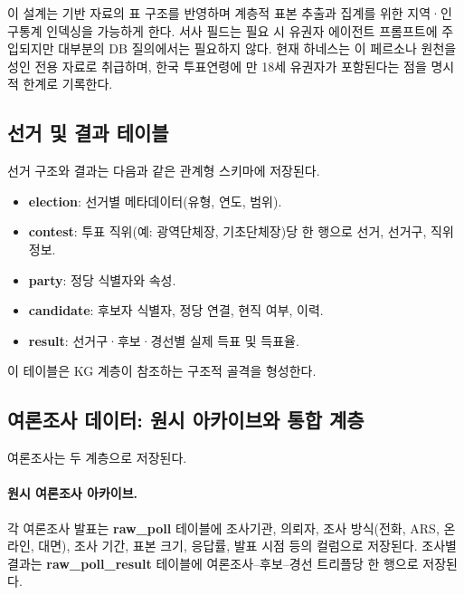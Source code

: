 \documentclass[11pt]{article}
\begin{document}
이 설계는 기반 자료의 표 구조를 반영하며 계층적 표본 추출과 집계를 위한 지역·인구통계 인덱싱을 가능하게 한다. 서사 필드는 필요 시 유권자 에이전트 프롬프트에 주입되지만 대부분의 DB 질의에서는 필요하지 않다. 현재 하네스는 이 페르소나 원천을 성인 전용 자료로 취급하며, 한국 투표연령에 만 18세 유권자가 포함된다는 점을 명시적 한계로 기록한다.

\subsection{선거 및 결과 테이블}

선거 구조와 결과는 다음과 같은 관계형 스키마에 저장된다.

\begin{itemize}
  \item \textbf{election}: 선거별 메타데이터(유형, 연도, 범위).
  \item \textbf{contest}: 투표 직위(예: 광역단체장, 기초단체장)당 한 행으로 선거, 선거구, 직위 정보.
  \item \textbf{party}: 정당 식별자와 속성.
  \item \textbf{candidate}: 후보자 식별자, 정당 연결, 현직 여부, 이력.
  \item \textbf{result}: 선거구·후보·경선별 실제 득표 및 득표율.
\end{itemize}

이 테이블은 KG 계층이 참조하는 구조적 골격을 형성한다.

\subsection{여론조사 데이터: 원시 아카이브와 통합 계층}

여론조사는 두 계층으로 저장된다.

\paragraph{원시 여론조사 아카이브.} 각 여론조사 발표는 \textbf{raw\_poll} 테이블에 조사기관, 의뢰자, 조사 방식(전화, ARS, 온라인, 대면), 조사 기간, 표본 크기, 응답률, 발표 시점 등의 컬럼으로 저장된다. 조사별 결과는 \textbf{raw\_poll\_result} 테이블에 여론조사--후보--경선 트리플당 한 행으로 저장된다.
\end{document}
